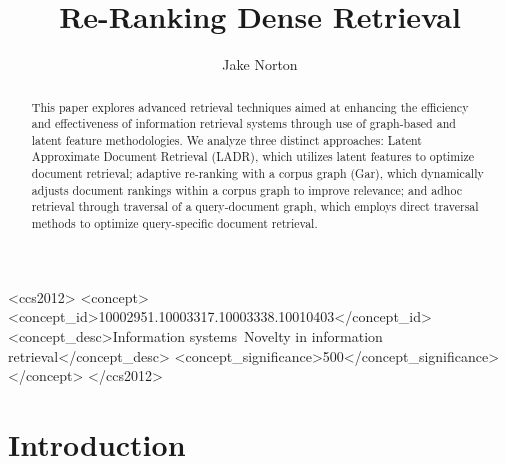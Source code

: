 \documentclass[sigconf,authorversion,nonacm]{acmart}
\begin{document}
 \title{Re-Ranking Dense Retrieval} \author{Jake Norton}  


\begin{abstract} This paper explores advanced retrieval techniques aimed at enhancing the efficiency
    and effectiveness of information retrieval systems through use of graph-based and
    latent feature methodologies. We analyze three distinct approaches: Latent Approximate Document
    Retrieval (LADR), which utilizes latent features to optimize document retrieval; adaptive
    re-ranking with a corpus graph (Gar), which dynamically adjusts document rankings within a
    corpus graph to improve relevance; and adhoc retrieval through traversal of a query-document
    graph, which employs direct traversal methods to optimize query-specific document retrieval.
\end{abstract}


\begin{CCSXML} <ccs2012> <concept> <concept_id>10002951.10003317.10003338.10010403</concept_id>
<concept_desc>Information systems~Novelty in information retrieval</concept_desc>
<concept_significance>500</concept_significance> </concept> </ccs2012> \end{CCSXML}



\maketitle
\section{Introduction} 
\end{document}
